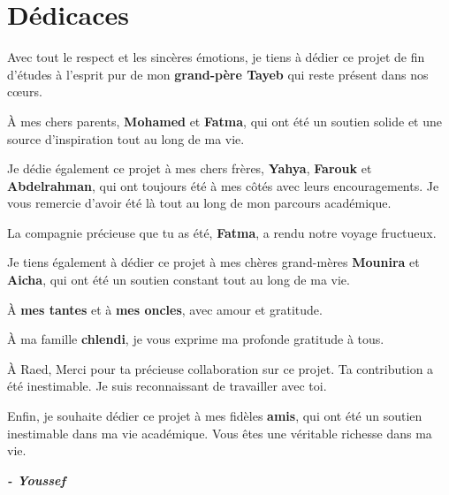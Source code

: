 \section*{Dédicaces}

\begin{fquote}
  \begin{center}
  \large{
  

  Avec tout le respect et les sincères émotions, je tiens à dédier ce projet de fin d'études à l'esprit pur de mon \textbf{grand-père Tayeb} qui reste présent dans nos cœurs.
  
  \smallskip
  
  À mes chers parents, \textbf{Mohamed} et \textbf{Fatma}, qui ont été un soutien solide et une source d'inspiration tout au long de ma vie.

  \smallskip
  
  Je dédie également ce projet à mes chers frères, \textbf{Yahya}, \textbf{Farouk} et \textbf{Abdelrahman}, qui ont toujours été à mes côtés avec leurs encouragements. Je vous remercie d'avoir été là tout au long de mon parcours académique.
  
  \smallskip
  
  La compagnie précieuse que tu as été, \textbf{Fatma}, a rendu notre voyage fructueux.
  
  \smallskip
  
  Je tiens également à dédier ce projet à mes chères grand-mères \textbf{Mounira} et \textbf{Aicha}, qui ont été un soutien constant tout au long de ma vie.
  
  \smallskip
  
  À \textbf{mes tantes} et à \textbf{mes oncles}, avec amour et gratitude.
  
  \smallskip
  
  À ma famille \textbf{chlendi}, je vous exprime ma profonde gratitude à tous.
  
  \smallskip

  À Raed, Merci pour ta précieuse collaboration sur ce projet. Ta contribution a été inestimable. Je suis reconnaissant de 
  travailler avec toi.
  
  \smallskip
  
  Enfin, je souhaite dédier ce projet à mes fidèles \textbf{amis}, qui ont été un soutien inestimable dans ma vie académique. Vous êtes une véritable richesse dans ma vie.   
  }
  \end{center}
\end{fquote}

\begin{adjustwidth}{2cm}{1cm}
  \hspace*{\fill} \textbf{\textit{\large{- Youssef}}}
\end{adjustwidth}



\clearpage